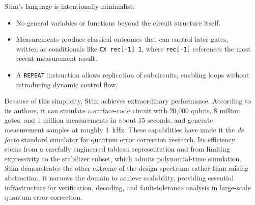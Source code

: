 Stim’s language is intentionally minimalist:
\begin{itemize}
  \item No general variables or functions beyond the circuit structure itself.
  \item Measurements produce classical outcomes that can control later gates, written as conditionals like \texttt{CX rec[-1] 1}, where \texttt{rec[-1]} references the most recent measurement result.
  \item A \texttt{REPEAT} instruction allows replication of subcircuits, enabling loops without introducing dynamic control flow.
\end{itemize}

Because of this simplicity, Stim achieves extraordinary performance. 
According to its authors, it can simulate a surface-code circuit with 20{,}000 qubits, 8 million gates, and 1 million measurements in about 15 seconds, and generate measurement samples at roughly 1~kHz. 
These capabilities have made it the \emph{de facto} standard simulator for quantum error correction research. 
Its efficiency stems from a carefully engineered tableau representation and from limiting expressivity to the stabilizer subset, which admits polynomial-time simulation. 
Stim demonstrates the other extreme of the design spectrum: rather than raising abstraction, it narrows the domain to achieve scalability, providing essential infrastructure for verification, decoding, and fault-tolerance analysis in large-scale quantum error correction.



